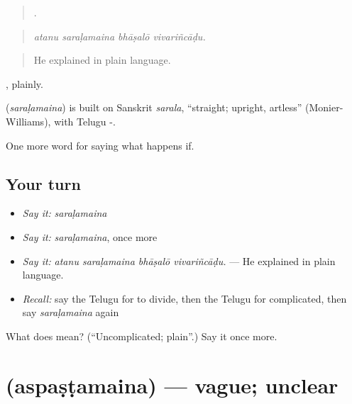 \begin{quote}
   .
\end{quote}

\begin{quote}
\emph{atanu saraḷamaina bhāṣalō vivariñcāḍu.}
\end{quote}

\begin{quote}
He explained in plain language.
\end{quote}

, plainly.

\begin{cousinweb}
\textbf{} (\emph{saraḷamaina}) is built on Sanskrit \emph{sarala}, \textquotedblleft{}straight; upright, artless\textquotedblright{} (Monier-Williams), with Telugu -.
\end{cousinweb}

\begin{grammarlens}[title={What you've built}]
One more word for saying what happens if.
\end{grammarlens}

\subsection*{Your turn}
\begin{itemize}
\raggedright
  \item \emph{Say it:} \emph{saraḷamaina}
  \item \emph{Say it:} \emph{saraḷamaina}, once more
  \item \emph{Say it:} \emph{atanu saraḷamaina bhāṣalō vivariñcāḍu.} — He explained in plain language.
  \item \emph{Recall:} say the Telugu for to divide, then the Telugu for complicated, then say \emph{saraḷamaina} again
\end{itemize}

\begin{tcolorbox}[breakable,colback=teal!4,colframe=teal!35!black,title={Before you move on}]
What does  mean? (\textquotedblleft{}Uncomplicated; plain\textquotedblright{}.) Say it once more.
\end{tcolorbox}
\section[\texorpdfstring{\te{అస్పష్టమైన} (aspaṣṭamaina)}{అస్పష్టమైన (aspaṣṭamaina)}]{ (aspaṣṭamaina) — vague; unclear}

